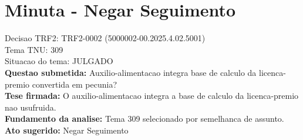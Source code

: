 \documentclass{article}
\begin{document}
\section*{Minuta - Negar Seguimento}
Decisao TRF2: TRF2-0002 (5000002-00.2025.4.02.5001)\\
Tema TNU: 309\\
Situacao do tema: JULGADO\\
\textbf{Questao submetida:} Auxilio-alimentacao integra base de calculo da licenca-premio convertida em pecunia?\\
\textbf{Tese firmada:} O auxilio-alimentacao integra a base de calculo da licenca-premio nao usufruida.\\
\textbf{Fundamento da analise:} Tema 309 selecionado por semelhanca de assunto.\\
\textbf{Ato sugerido:} Negar Seguimento
\end{document}
